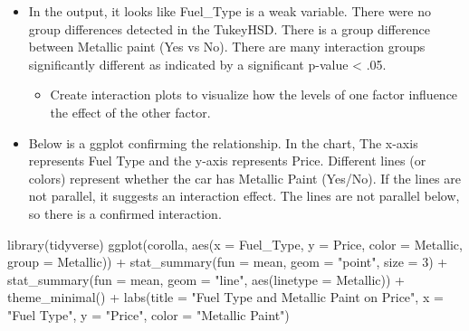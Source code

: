 \documentclass[
  letterpaper,
  DIV=11,
  numbers=noendperiod]{scrreprt}
\newenvironment{Shaded}{\begin{snugshade}}{\end{snugshade}}
\newcommand{\AttributeTok}[1]{\textcolor[rgb]{0.40,0.45,0.13}{#1}}
\newcommand{\DecValTok}[1]{\textcolor[rgb]{0.68,0.00,0.00}{#1}}
\newcommand{\FunctionTok}[1]{\textcolor[rgb]{0.28,0.35,0.67}{#1}}
\newcommand{\NormalTok}[1]{\textcolor[rgb]{0.00,0.23,0.31}{#1}}
\newcommand{\SpecialCharTok}[1]{\textcolor[rgb]{0.37,0.37,0.37}{#1}}
\newcommand{\StringTok}[1]{\textcolor[rgb]{0.13,0.47,0.30}{#1}}
\providecommand{\tightlist}{%
  \setlength{\itemsep}{0pt}\setlength{\parskip}{0pt}}\usepackage{longtable,booktabs,array}
\begin{document}
\begin{itemize}
\item
  In the output, it looks like Fuel\_Type is a weak variable. There were
  no group differences detected in the TukeyHSD. There is a group
  difference between Metallic paint (Yes vs No). There are many
  interaction groups significantly different as indicated by a
  significant p-value \textless{} .05.

  \begin{itemize}
  \tightlist
  \item
    Create interaction plots to visualize how the levels of one factor
    influence the effect of the other factor.
  \end{itemize}
\item
  Below is a ggplot confirming the relationship. In the chart, The
  x-axis represents Fuel Type and the y-axis represents Price. Different
  lines (or colors) represent whether the car has Metallic Paint
  (Yes/No). If the lines are not parallel, it suggests an interaction
  effect. The lines are not parallel below, so there is a confirmed
  interaction.
\end{itemize}

\begin{Shaded}
\begin{Highlighting}[]
\FunctionTok{library}\NormalTok{(tidyverse)}
\FunctionTok{ggplot}\NormalTok{(corolla, }\FunctionTok{aes}\NormalTok{(}\AttributeTok{x =}\NormalTok{ Fuel\_Type, }\AttributeTok{y =}\NormalTok{ Price, }\AttributeTok{color =}\NormalTok{ Metallic, }\AttributeTok{group =}\NormalTok{ Metallic)) }\SpecialCharTok{+}
    \FunctionTok{stat\_summary}\NormalTok{(}\AttributeTok{fun =}\NormalTok{ mean, }\AttributeTok{geom =} \StringTok{"point"}\NormalTok{, }\AttributeTok{size =} \DecValTok{3}\NormalTok{) }\SpecialCharTok{+} \FunctionTok{stat\_summary}\NormalTok{(}\AttributeTok{fun =}\NormalTok{ mean,}
    \AttributeTok{geom =} \StringTok{"line"}\NormalTok{, }\FunctionTok{aes}\NormalTok{(}\AttributeTok{linetype =}\NormalTok{ Metallic)) }\SpecialCharTok{+} \FunctionTok{theme\_minimal}\NormalTok{() }\SpecialCharTok{+} \FunctionTok{labs}\NormalTok{(}\AttributeTok{title =} \StringTok{"Fuel Type and Metallic Paint on Price"}\NormalTok{,}
    \AttributeTok{x =} \StringTok{"Fuel Type"}\NormalTok{, }\AttributeTok{y =} \StringTok{"Price"}\NormalTok{, }\AttributeTok{color =} \StringTok{"Metallic Paint"}\NormalTok{)}
\end{Highlighting}
\end{Shaded}
\end{document}
